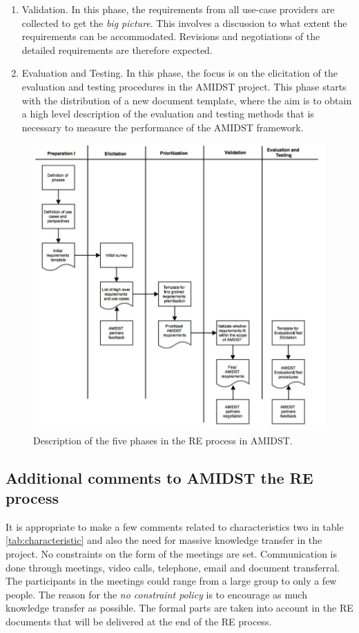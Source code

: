 \documentclass[11pt, oneside]{article}   	%
\begin{document}
\begin{enumerate}
 \item Validation. In this phase, the requirements from all use-case providers are collected to get the \emph{big picture}.  This involves a discussion to what extent the requirements can be accommodated. Revisions and negotiations of the detailed requirements are therefore expected.  
 \item Evaluation and Testing. In this phase, the focus is on the elicitation of the evaluation and testing procedures in the AMIDST project. This phase starts with the distribution of a new document template, where the aim is to obtain a high level description of the evaluation and testing methods that is necessary to measure the performance of the AMIDST framework.
\end{enumerate}

\begin{figure}
\centering
\includegraphics [keepaspectratio,width = 14cm] {REprocess1}
\caption{Description of the five phases in the RE process in AMIDST.}
\label{REprocess1}
\end{figure}

\subsection{Additional comments to AMIDST the RE process}

It is appropriate to make a few comments related to characteristics two in table \ref{tab:characteristic} and also the need for massive knowledge transfer in the project.  No constraints on the form of the meetings are set.  Communication is done through meetings, video calls, telephone, email and document transferral.  The participants in the meetings could range from a large group to only a few people.  The reason for the \emph{no constraint policy} is to encourage as much knowledge transfer as possible.  The formal parts are taken into account in the RE documents that will be delivered at the end of the RE process. 
\end{document}
